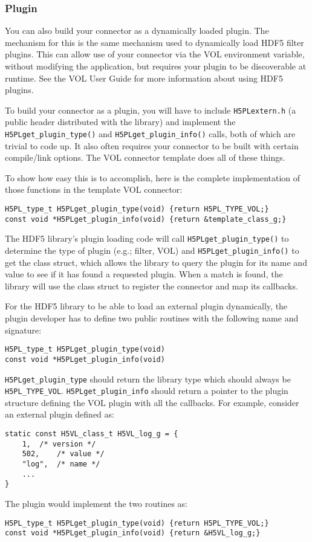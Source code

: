 \subsubsection*{Plugin}

You can also build your connector as a dynamically loaded plugin. The mechanism
for this is the same mechanism used to dynamically load HDF5 filter plugins. This can
allow use of your connector via the VOL environment variable, without modifying
the application, but requires your plugin to be discoverable at runtime. See
the VOL User Guide for more information about using HDF5 plugins.

To build your connector as a plugin, you will have to include {\tt H5PLextern.h}
(a public header distributed with the library) and implement the
{\tt H5PLget\_plugin\_type()} and {\tt H5PLget\_plugin\_info()}
calls, both of which are trivial to code up. It also often requires your
connector to be built with certain compile/link options. The VOL connector
template does all of these things.

To show how easy this is to accomplish, here is the complete implementation
of those functions in the template VOL connector:

\begin{lstlisting}
H5PL_type_t H5PLget_plugin_type(void) {return H5PL_TYPE_VOL;}
const void *H5PLget_plugin_info(void) {return &template_class_g;}
\end{lstlisting}

The HDF5 library's plugin loading code will call {\tt H5PLget\_plugin\_type()}
to determine the type of plugin (e.g.; filter, VOL) and {\tt H5PLget\_plugin\_info()}
to get the class struct, which allows the library to query the plugin for its
name and value to see if it has found a requested plugin. When a match is found,
the library will use the class struct to register the connector and map its callbacks.

For the HDF5 library to be able to load an external plugin dynamically, the plugin developer has to define two public routines with the following name and signature:
\begin{lstlisting}
H5PL_type_t H5PLget_plugin_type(void)
const void *H5PLget_plugin_info(void)
\end{lstlisting}
{\tt H5PLget\_plugin\_type} should return the library type which should always be {\tt H5PL\_TYPE\_VOL}. {\tt H5PLget\_plugin\_info} should return a pointer to the plugin structure defining the VOL plugin with all the callbacks. For example, consider an external plugin defined as:
\begin{lstlisting}
static const H5VL_class_t H5VL_log_g = {
    1,	/* version */
    502,	/* value */
    "log",	/* name */
    ...
}
\end{lstlisting}
The plugin would implement the two routines as:
\begin{lstlisting}
H5PL_type_t H5PLget_plugin_type(void) {return H5PL_TYPE_VOL;}
const void *H5PLget_plugin_info(void) {return &H5VL_log_g;}
\end{lstlisting}

